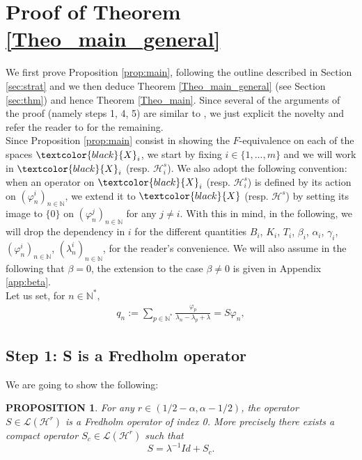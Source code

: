 \documentclass[11pt, dvipsnames]{amsart}
\newtheorem{prop}[theorem]{PROPOSITION}
\begin{document}
\section{Proof of Theorem \ref{Theo_main_general}}

We first prove Proposition \ref{prop:main}, following the outline described in Section \ref{sec:strat} and we then deduce Theorem \ref{Theo_main_general} (see Section \ref{sec:thm}) and hence Theorem \ref{Theo_main}. Since several of the arguments of the proof (namely steps 1, 4, 5) are similar to \cite{Gagnon2022-fredholm},
we just explicit the novelty and refer the reader to \cite{Gagnon2022-fredholm} for the remaining.\\

Since Proposition \ref{prop:main} consist in showing the $F$-equivalence on each of the spaces $\textcolor{black}{X}_{i}$, we start by fixing $i\in\{1,...,m\}$ and we will work in $\textcolor{black}{X}_{i}$ (resp. $\mathcal{H}^{s}_{i}$). We also adopt the following convention: when an operator on $\textcolor{black}{X}_{i}$ (resp. $\mathcal{H}^{s}_{i}$) is defined by its action on $(\varphi_{n}^{i})_{n\in\mathbb{N}}$, we extend it to $\textcolor{black}{X}$ (resp. $\mathcal{H}^{s}$) by setting its image to $\{0\}$ on  $(\varphi_{n}^{j})_{n\in\mathbb{N}}$ for any $j\neq i$. With this in mind, in the following, we will drop the dependency in $i$ for the different quantities $B_{i}$, $K_{i}$, $T_{i}$, $\beta_{i}$, $\alpha_{i}$, $\gamma_{i}$, $(\varphi_{n}^{i})_{n\in\mathbb{N}}$, $(\lambda_{n}^{i})_{n\in\mathbb{N}}$, for the reader's convenience. We will also assume in the following that $\beta=0$, the extension to the case $\beta\neq0$ is given in Appendix \ref{app:beta}.\\ 

 Let us set, for $n\in\mathbb{N}^*,$
 \begin{align}
     q_n:=\sum_{p\in \mathbb{N}^*}\frac{\varphi_p}{\lambda_n-\lambda_p+\lambda} = S \varphi_{n},\label{q_n}
 \end{align}
\subsection{Step 1: S is a Fredholm operator}
\label{sec:step1}

We are going to show the following:
\begin{prop}
\label{prop:fredholm}
    For any $r\in(1/2-\alpha,\alpha-1/2)$, the operator $S\in\mathcal{L}(\mathcal{H}^{r})$ is a Fredholm operator of index 0. More precisely there exists a compact operator $S_{c}\in\mathcal{L}(\mathcal{H}^{r})$ such that
    \begin{equation}
        S = \lambda^{-1} Id +S_{c}.
    \end{equation}
\end{prop}
\end{document}
